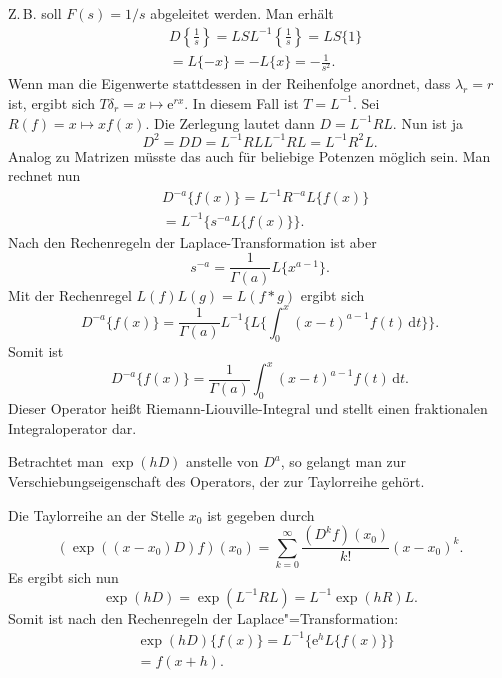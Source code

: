 \documentclass[a4paper,10pt,fleqn,twocolumn,twoside]{article}
\numberwithin{equation}{section}
\newcommand{\ee}{\mathrm e}
\begin{document}
Z.\,B. soll $F(s)=1/s$ abgeleitet werden. Man erhält%
\begin{equation}
\begin{split}
& D\left\{\frac{1}{s}\right\}
= LSL^{-1}\left\{\frac{1}{s}\right\} = LS\{1\}\\
&= L\{-x\} = -L\{x\} = -\frac{1}{s^2}.
\end{split}
\end{equation}
Wenn man die Eigenwerte stattdessen in der Reihenfolge anordnet,
dass $\lambda_r=r$ ist, ergibt sich
$T\delta_r=x\mapsto\ee^{rx}$. In diesem Fall ist $T=L^{-1}$.
Sei $R(f)=x\mapsto xf(x)$. Die Zerlegung lautet dann
$D=L^{-1}RL$. Nun ist ja
\begin{equation}
D^2 = DD = L^{-1}RLL^{-1}RL = L^{-1}R^2L.
\end{equation}
Analog zu Matrizen müsste das auch für beliebige Potenzen möglich
sein. Man rechnet nun
\begin{equation}
\begin{split}
& D^{-a}\{f(x)\} = L^{-1}R^{-a}L\{f(x)\}\\
&= L^{-1}\{s^{-a}L\{f(x)\}\}.
\end{split}
\end{equation}
Nach den Rechenregeln der Laplace-Transformation ist aber
\begin{equation}
s^{-a} = \frac{1}{\Gamma(a)}L\{x^{a-1}\}.
\end{equation}
Mit der Rechenregel $L(f)L(g) = L(f*g)$ ergibt sich
\[D^{-a}\{f(x)\}
= \frac{1}{\Gamma(a)}L^{-1}
\{L\{\int_0^x (x-t)^{a-1}f(t)\,\mathrm dt\}\}.\]
Somit ist
\begin{equation}
D^{-a}\{f(x)\}
= \frac{1}{\Gamma(a)}
\int_0^x (x-t)^{a-1}f(t)\,\mathrm dt.
\end{equation}
Dieser Operator heißt Riemann-Liouville-Integral und stellt
einen fraktionalen Integraloperator dar.

Betrachtet man $\exp(hD)$ anstelle von $D^a$, so gelangt man
zur Verschiebungseigenschaft des Operators, der zur
Taylorreihe gehört.

Die Taylorreihe an der Stelle $x_0$ ist gegeben durch
\[(\exp((x-x_0)D)f)(x_0)
= \sum_{k=0}^\infty \frac{(D^k f)(x_0)}{k!}(x-x_0)^k.\]
Es ergibt sich nun
\begin{equation}
\exp(hD) = \exp(L^{-1} R L) = L^{-1} \exp(hR) L.
\end{equation}
Somit ist nach den Rechenregeln der Laplace"=Transformation:
\begin{equation}
\begin{split}
& \exp(hD)\{f(x)\} = L^{-1}\{\ee^h L\{f(x)\}\}\\
& = f(x+h).
\end{split}
\end{equation}
\end{document}
